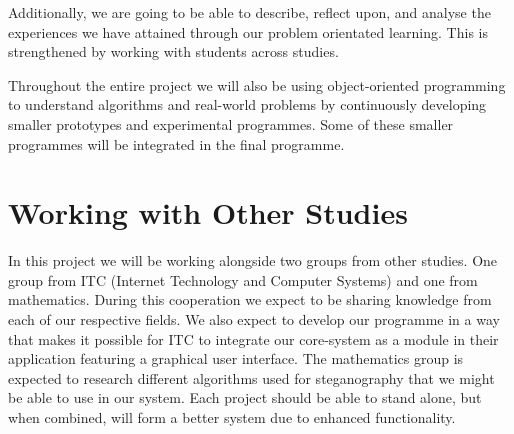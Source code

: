 \documentclass[a4paper,12pt,hidelinks]{article}
\begin{document}
Additionally, we are going to be able to describe, reflect upon, and analyse the experiences we have attained through our problem orientated learning. This is strengthened by working with students across studies.

Throughout the entire project we will also be using object-oriented programming to understand algorithms and real-world problems by continuously developing smaller prototypes and experimental programmes. Some of these smaller programmes will be integrated in the final programme.

\section*{Working with Other Studies}
 In this project we will be working alongside two groups from other studies. One group from ITC (Internet Technology and Computer Systems) and one from mathematics. During this cooperation we expect to be sharing knowledge from each of our respective fields. We also expect to develop our programme in a way that makes it possible for ITC to integrate our core-system as a module in their application featuring a graphical user interface. The mathematics group is expected to research different algorithms used for steganography that we might be able to use in our system. Each project should be able to stand alone, but when combined, will form a better system due to enhanced functionality.
 
\end{document}
